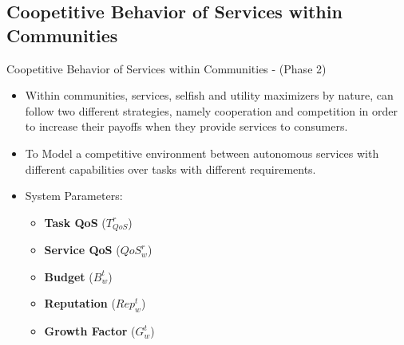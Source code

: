 \documentclass{beamer}
\begin{document}
\subsection{Coopetitive Behavior of Services within Communities}
\begin{frame}{Coopetitive Behavior of Services within Communities - (Phase 2)}
    \begin{itemize}
        \item Within communities, services, selfish and utility maximizers by nature, can follow two different strategies, namely cooperation and competition in order to increase their payoffs when they provide services to consumers.
        \item To Model a competitive environment between autonomous services with different capabilities over tasks with different requirements.
        \item System Parameters:
        \begin{itemize}
            \item \textbf{Task QoS} ($T_{QoS}^r$)
            \item \textbf{Service QoS} ($QoS_w^r$)
            \item \textbf{Budget} ($B_w^t$)
            \item \textbf{Reputation} ($Rep_w^t$)
            \item \textbf{Growth Factor} ($G_w^t$)
        \end{itemize}
    \end{itemize}
\end{frame}
\end{document}
